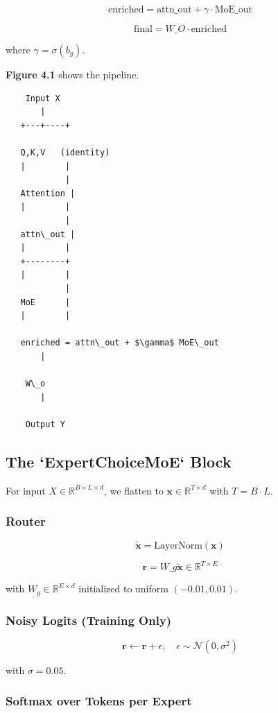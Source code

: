 \[
\text{enriched} = \text{attn\_out} + \gamma \cdot \text{MoE\_out}
\tag{4.3}
\]

\[
\text{final} = W\_O \cdot \text{enriched}
\tag{4.4}
\]

where $\gamma = \sigma(b_g)$.

\textbf{Figure 4.1} shows the pipeline.

\begin{lstlisting}
    Input X
       |
   +---+----+
             
   Q,K,V   (identity)
   |        |
            |
   Attention |
   |        |
            |
   attn\_out |
   |        |
   +--------+
   |        |
            |
   MoE      |
   |        |
             
   enriched = attn\_out + $\gamma$ MoE\_out
       |
        
    W\_o
       |
        
    Output Y
\end{lstlisting}

\subsection{The `ExpertChoiceMoE` Block}

For input $X \in \mathbb{R}^{B \times L \times d}$, we flatten to 
$\mathbf{x} \in \mathbb{R}^{T \times d}$ with $T = B \cdot L$.

\subsubsection{Router}

\[
\tilde{\mathbf{x}} = \text{LayerNorm}(\mathbf{x})
\tag{4.5}
\]

\[
\mathbf{r} = W\_g \tilde{\mathbf{x}} \in \mathbb{R}^{T \times E}
\tag{4.6}
\]

with $W_g \in \mathbb{R}^{E \times d}$ initialized to uniform $(-0.01, 0.01)$.

\subsubsection{Noisy Logits (Training Only)}

\[
\mathbf{r} \leftarrow \mathbf{r} + \epsilon, \quad \epsilon \sim \mathcal{N}(0, \sigma^2)
\tag{4.7}
\]

with $\sigma = 0.05$.

\subsubsection{Softmax over Tokens per Expert}

